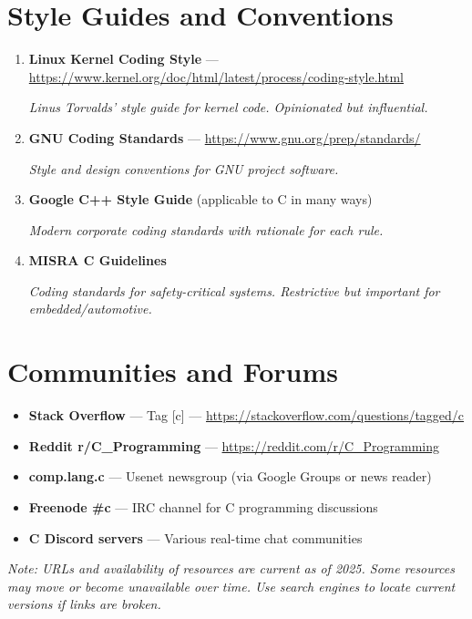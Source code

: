 \documentclass[10pt,openany]{book}
\begin{document}
\section*{Style Guides and Conventions}

\begin{enumerate}
    \item \textbf{Linux Kernel Coding Style} — \url{https://www.kernel.org/doc/html/latest/process/coding-style.html}

    \textit{Linus Torvalds' style guide for kernel code. Opinionated but influential.}

    \item \textbf{GNU Coding Standards} — \url{https://www.gnu.org/prep/standards/}

    \textit{Style and design conventions for GNU project software.}

    \item \textbf{Google C++ Style Guide} (applicable to C in many ways)

    \textit{Modern corporate coding standards with rationale for each rule.}

    \item \textbf{MISRA C Guidelines}

    \textit{Coding standards for safety-critical systems. Restrictive but important for embedded/automotive.}
\end{enumerate}

\section*{Communities and Forums}

\begin{itemize}
    \item \textbf{Stack Overflow} — Tag [c] — \url{https://stackoverflow.com/questions/tagged/c}
    \item \textbf{Reddit r/C\_Programming} — \url{https://reddit.com/r/C_Programming}
    \item \textbf{comp.lang.c} — Usenet newsgroup (via Google Groups or news reader)
    \item \textbf{Freenode \#c} — IRC channel for C programming discussions
    \item \textbf{C Discord servers} — Various real-time chat communities
\end{itemize}

\vspace{2em}

\textit{Note: URLs and availability of resources are current as of 2025. Some resources may move or become unavailable over time. Use search engines to locate current versions if links are broken.}
\end{document}
